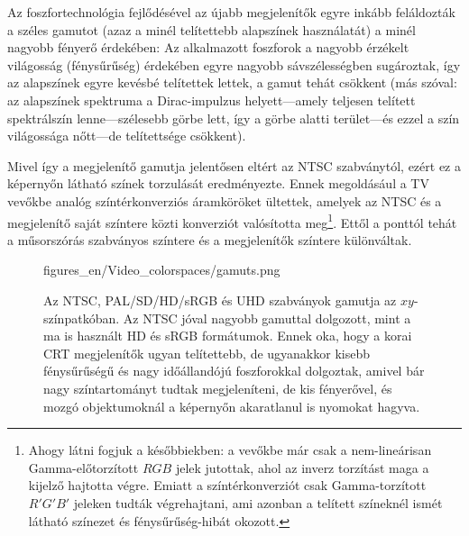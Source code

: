 \vspace{3mm}
Az foszfortechnológia fejlődésével az újabb megjelenítők egyre inkább feláldozták a széles gamutot (azaz a minél telítettebb alapszínek használatát) a minél nagyobb fényerő érdekében: 
Az alkalmazott foszforok a nagyobb érzékelt világosság (fénysűrűség) érdekében egyre nagyobb sávszélességben sugároztak, így az alapszínek egyre kevésbé telítettek lettek, a gamut tehát csökkent (más szóval: az alapszínek spektruma a Dirac-impulzus helyett---amely teljesen telített spektrálszín lenne---szélesebb görbe lett, így a görbe alatti terület---és ezzel a szín világossága nőtt---de telítettsége csökkent).

Mivel így a megjelenítő gamutja jelentősen eltért az NTSC szabványtól, ezért ez a képernyőn látható színek torzulását eredményezte.
Ennek megoldásául a TV vevőkbe analóg színtérkonverziós áramköröket ültettek, amelyek az NTSC és a megjelenítő saját színtere közti konverziót valósította meg\footnote{Ahogy látni fogjuk a későbbiekben: a vevőkbe már csak a nem-lineárisan Gamma-előtorzított $RGB$ jelek jutottak, ahol az inverz torzítást maga a kijelző hajtotta végre. Emiatt a színtérkonverziót csak Gamma-torzított $R'G'B'$ jeleken tudták végrehajtani, ami azonban a telített színeknél ismét látható színezet és fénysűrűség-hibát okozott.}.
Ettől a ponttól tehát a műsorszórás szabványos színtere és a megjelenítők színtere különváltak.

\begin{figure}[]
	\centering
	\begin{overpic}[width = 0.7\columnwidth ]{figures_en/Video_colorspaces/gamuts.png}
	\end{overpic}
	\caption{Az NTSC, PAL/SD/HD/sRGB és UHD szabványok gamutja az $xy$-színpatkóban.
	Az NTSC jóval nagyobb gamuttal dolgozott, mint a ma is használt HD és sRGB formátumok. Ennek oka, hogy a korai CRT megjelenítők ugyan telítettebb, de ugyanakkor kisebb fénysűrűségű és nagy időállandójú foszforokkal dolgoztak, amivel bár nagy színtartományt tudtak megjeleníteni, de kis fényerővel, és mozgó objektumoknál a képernyőn akaratlanul is nyomokat hagyva.}
	\label{Fig:gamut}
\end{figure}
